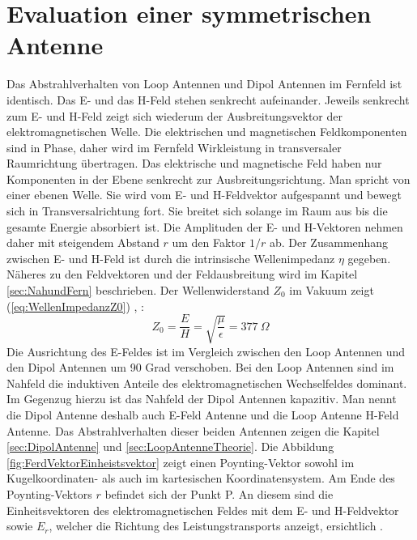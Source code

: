 
\newpage
\chapter{Evaluation einer symmetrischen Antenne}

Das Abstrahlverhalten von Loop Antennen und Dipol Antennen im Fernfeld ist identisch. Das E- und das H-Feld stehen senkrecht aufeinander. Jeweils senkrecht zum E- und H-Feld zeigt sich wiederum der Ausbreitungsvektor der elektromagnetischen Welle. Die elektrischen und magnetischen Feldkomponenten sind in Phase, daher wird im Fernfeld Wirkleistung in transversaler Raumrichtung
übertragen. Das elektrische und magnetische Feld haben nur Komponenten in der Ebene senkrecht zur Ausbreitungsrichtung. Man spricht von einer ebenen Welle. Sie wird vom E- und H-Feldvektor aufgespannt und bewegt sich in
Transversalrichtung fort. Sie breitet sich solange im Raum aus bis die gesamte Energie absorbiert ist. Die Amplituden der E- und H-Vektoren nehmen daher mit steigendem Abstand $r$ um den Faktor $1/r$ ab. Der Zusammenhang zwischen E- und H-Feld ist durch die intrinsische Wellenimpedanz $\eta$ gegeben. Näheres zu den Feldvektoren und der Feldausbreitung wird im Kapitel \ref{sec:NahundFern} beschrieben. Der Wellenwiderstand $Z_0$ im Vakuum zeigt (\ref{eq:WellenImpedanzZ0}) \cite{Harrington-TimeHarmonic}, \cite{Emant}:
\begin{equation}\label{eq:WellenImpedanzZ0}
Z_{0}=\dfrac{E}{H}=\sqrt{\dfrac{\mu}{\epsilon}}=377\ \Omega
\end{equation}
Die Ausrichtung des E-Feldes ist im Vergleich zwischen den Loop Antennen und den Dipol Antennen um 90 Grad verschoben. Bei den Loop Antennen sind im Nahfeld die induktiven Anteile des elektromagnetischen Wechselfeldes dominant. Im Gegenzug hierzu ist das Nahfeld der Dipol Antennen kapazitiv. Man nennt die Dipol Antenne deshalb auch E-Feld Antenne und die Loop Antenne H-Feld Antenne. Das Abstrahlverhalten dieser beiden Antennen zeigen die Kapitel \ref{sec:DipolAntenne} und \ref{sec:LoopAntenneTheorie}. Die Abbildung \ref{fig:FerdVektorEinheistsvektor} zeigt einen Poynting-Vektor sowohl im Kugelkoordinaten- als auch im kartesischen Koordinatensystem. Am Ende des Poynting-Vektors $r$ befindet sich der Punkt P. An diesem sind die Einheitsvektoren des elektromagnetischen Feldes mit dem E- und H-Feldvektor sowie ${E}_r$, welcher die Richtung des Leistungstransports anzeigt, ersichtlich \cite{Emant}. \\

